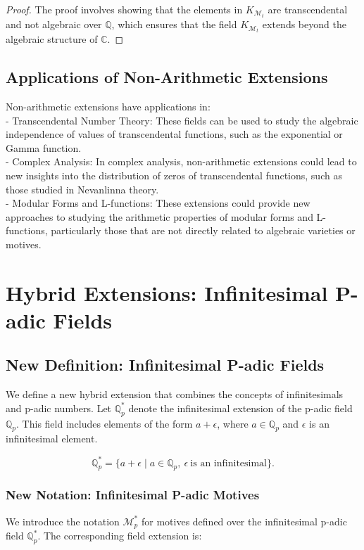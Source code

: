 \documentclass{article}
\begin{document}
\begin{proof}
The proof involves showing that the elements in \(K_{\mathcal{M}_{t}}\) are transcendental and not algebraic over \(\mathbb{Q}\), which ensures that the field \(K_{\mathcal{M}_{t}}\) extends beyond the algebraic structure of \(\mathbb{C}\).
\end{proof}

\subsection{Applications of Non-Arithmetic Extensions}
Non-arithmetic extensions have applications in:
{\ }\\
- Transcendental Number Theory: These fields can be used to study the algebraic independence of values of transcendental functions, such as the exponential or Gamma function.
{\ }\\
- Complex Analysis: In complex analysis, non-arithmetic extensions could lead to new insights into the distribution of zeros of transcendental functions, such as those studied in Nevanlinna theory.
{\ }\\
- Modular Forms and L-functions: These extensions could provide new approaches to studying the arithmetic properties of modular forms and L-functions, particularly those that are not directly related to algebraic varieties or motives.


\section{Hybrid Extensions: Infinitesimal P-adic Fields}
\subsection{New Definition: Infinitesimal P-adic Fields}
We define a new hybrid extension that combines the concepts of infinitesimals and p-adic numbers. Let \(\mathbb{Q}_{p}^*\) denote the infinitesimal extension of the p-adic field \(\mathbb{Q}_p\). This field includes elements of the form \(a + \epsilon\), where \(a \in \mathbb{Q}_p\) and \(\epsilon\) is an infinitesimal element.

\[
\mathbb{Q}_{p}^* = \{ a + \epsilon \mid a \in \mathbb{Q}_p, \ \epsilon \ \text{is an infinitesimal} \}.
\]

\subsubsection{New Notation: Infinitesimal P-adic Motives}
We introduce the notation \(\mathcal{M}_{p}^*\) for motives defined over the infinitesimal p-adic field \(\mathbb{Q}_{p}^*\). The corresponding field extension is:
\end{document}
